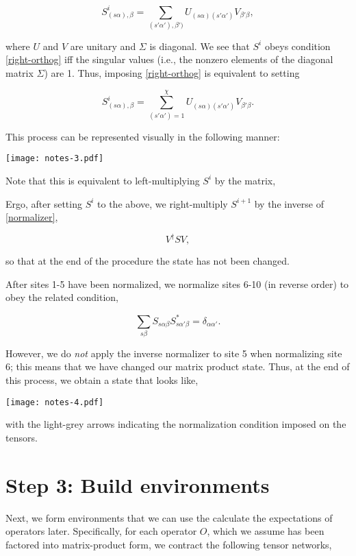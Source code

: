 \documentclass[12pt]{amsart}
\begin{document}
    $$S^i_{(s\alpha),\beta} = \sum_{(s'\alpha'),\beta')}U_{(s\alpha)(s'\alpha')} V_{\beta'\beta},$$

\noindent where $U$ and $V$ are unitary and $\Sigma$ is diagonal.  We see that $S^i$ obeys condition \eqref{right-orthog} iff the singular values (i.e., the nonzero elements of the diagonal matrix $\Sigma$) are 1.  Thus, imposing \eqref{right-orthog} is equivalent to setting

    $$S^i_{(s\alpha),\beta} = \sum_{(s'\alpha')=1}^\chi U_{(s\alpha)(s'\alpha')} V_{\beta'\beta}.$$

This process can be represented visually in the following manner:

    \texttt{[image: notes-3.pdf]}

Note that this is equivalent to left-multiplying $S^i$ by the matrix,


Ergo, after setting $S^i$ to the above, we right-multiply $S^{i+1}$ by the inverse of \eqref{normalizer},

    $$V^\dagger S V,$$

\noindent so that at the end of the procedure the state has not been changed.

After sites 1-5 have been normalized, we normalize sites 6-10 (in reverse order) to obey the related condition,

    $$\sum_{s\beta} S_{s\alpha\beta} S_{s\alpha'\beta}^* = \delta_{\alpha\alpha'}.$$

However, we do \emph{not} apply the inverse normalizer to site 5 when normalizing site 6;  this means that we have changed our matrix product state.  Thus, at the end of this process, we obtain a state that looks like,

    \begin{center}\texttt{[image: notes-4.pdf]}\end{center}

\noindent with the light-grey arrows indicating the normalization condition imposed on the tensors.

\section*{Step 3:  Build environments}

\label{absorb-multisite-procedure}

Next, we form environments that we can use the calculate the expectations of operators later.  Specifically, for each operator $O$, which we assume has been factored into matrix-product form, we contract the following tensor networks,
\end{document}
